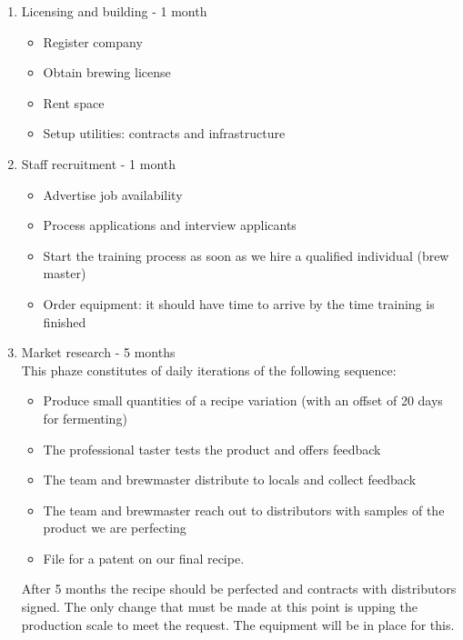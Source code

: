 \documentclass[11pt]{article}
\begin{document}
  \begin{enumerate}
  \item Licensing and building - 1 month
    \begin{itemize}
    \item Register company
    \item Obtain brewing license
    \item Rent space
    \item Setup utilities: contracts and infrastructure
    \end{itemize}

  \item Staff recruitment - 1 month
    \begin{itemize}
    \item Advertise job availability
    \item Process applications and interview applicants
    \item Start the training process as soon as we hire a qualified individual (brew master)
    \item Order equipment: it should have time to arrive by the time training is finished
    \end{itemize}

  \item Market research - 5 months\\
  This phaze constitutes of daily iterations of the following sequence:
    \begin{itemize}
    \item Produce small quantities of a recipe variation (with an offset of 20 days for fermenting)
    \item The professional taster tests the product and offers feedback
    \item The team and brewmaster distribute to locals and collect feedback
    \item The team and brewmaster reach out to distributors with samples of the product we are perfecting
    \item File for a patent on our final recipe.
    \end{itemize}
  \noindent After 5 months the recipe should be perfected and contracts with distributors signed. The only change that must be made at this point is upping the production scale to meet the request. The equipment will be in place for this.
  \end{enumerate}
\end{document}
